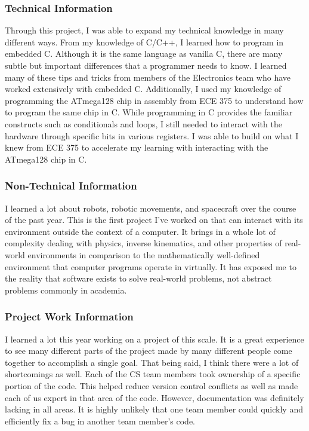\subsubsection{Technical Information}
Through this project, I was able to expand my technical knowledge in many
different ways.
From my knowledge of C/C++, I learned how to program in embedded C.
Although it is the same language as vanilla C, there are many subtle but
important differences that a programmer needs to know.
I learned many of these tips and tricks from members of the Electronics team
who have worked extensively with embedded C.
Additionally, I used my knowledge of programming the ATmega128 chip in assembly
from ECE 375 to understand how to program the same chip in C.
While programming in C provides the familiar constructs such as conditionals
and loops, I still needed to interact with the hardware through specific bits
in various registers.
I was able to build on what I knew from ECE 375 to accelerate my learning with 
interacting with the ATmega128 chip in C.

\subsubsection{Non-Technical Information}
I learned a lot about robots, robotic movements, and spacecraft over the course
of the past year.
This is the first project I've worked on that can interact with its environment
outside the context of a computer.
It brings in a whole lot of complexity dealing with physics, inverse kinematics,
and other properties of real-world environments in comparison to the
mathematically well-defined environment that computer programs operate in 
virtually.
It has exposed me to the reality that software exists to solve real-world
problems, not abstract problems commonly in academia.

\subsubsection{Project Work Information}
I learned a lot this year working on a project of this scale.
It is a great experience to see many different parts of the project made by
many different people come together to accomplish a single goal.
That being said, I think there were a lot of shortcomings as well.
Each of the CS team members took ownership of a specific portion of the code.
This helped reduce version control conflicts as well as made each of us
expert in that area of the code.
However, documentation was definitely lacking in all areas.
It is highly unlikely that one team member could quickly and efficiently fix a
bug in another team member's code.


